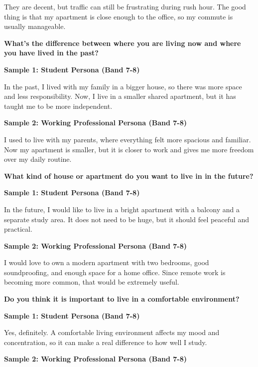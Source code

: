 They are decent, but traffic can still be frustrating during rush hour. The good thing is that my apartment is close enough to the office, so my commute is usually manageable.

\separator

\begin{ieltsquestion}
\textbf{What's the difference between where you are living now and where you have lived in the past?}
\end{ieltsquestion}
\textbf{Sample 1: Student Persona (Band 7-8)}

In the past, I lived with my family in a bigger house, so there was more space and less responsibility. Now, I live in a smaller shared apartment, but it has taught me to be more independent.

\textbf{Sample 2: Working Professional Persona (Band 7-8)}

I used to live with my parents, where everything felt more spacious and familiar. Now my apartment is smaller, but it is closer to work and gives me more freedom over my daily routine.

\separator

\begin{ieltsquestion}
\textbf{What kind of house or apartment do you want to live in in the future?}
\end{ieltsquestion}
\textbf{Sample 1: Student Persona (Band 7-8)}

In the future, I would like to live in a bright apartment with a balcony and a separate study area. It does not need to be huge, but it should feel peaceful and practical.

\textbf{Sample 2: Working Professional Persona (Band 7-8)}

I would love to own a modern apartment with two bedrooms, good soundproofing, and enough space for a home office. Since remote work is becoming more common, that would be extremely useful.

\separator

\begin{ieltsquestion}
\textbf{Do you think it is important to live in a comfortable environment?}
\end{ieltsquestion}
\textbf{Sample 1: Student Persona (Band 7-8)}

Yes, definitely. A comfortable living environment affects my mood and concentration, so it can make a real difference to how well I study.

\textbf{Sample 2: Working Professional Persona (Band 7-8)}


